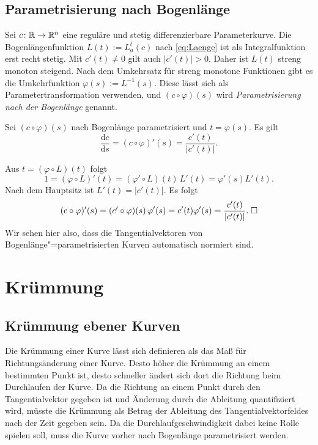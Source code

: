 \subsection{Parametrisierung nach Bogenlänge}

Sei $c\colon\mathbb R\to\mathbb R^n$ eine reguläre und stetig differenzierbare
Parameterkurve. Die Bogenlängenfunktion $L(t):=L_a^t(c)$ nach
\eqref{eq:Laenge} ist als Integralfunktion erst recht stetig.
Mit $c'(t)\ne 0$ gilt auch $|c'(t)|>0$. Daher ist $L(t)$ streng monoton
steigend. Nach dem Umkehrsatz für streng monotone Funktionen gibt es
die Umkehrfunktion $\varphi(s):=L^{-1}(s)$. Diese lässt sich als
Parametertransformation verwenden, und $(c\circ\varphi)(s)$ wird
\emph{Parametrisierung nach der Bogenlänge} genannt.

\begin{corollary}
Sei $(c\circ\varphi)(s)$ nach Bogenlänge parametrisiert
und $t=\varphi(s)$. Es gilt
\begin{equation}
\frac{\mathrm dc}{\mathrm ds} =
(c\circ\varphi)'(s) = \frac{c'(t)}{|c'(t)|}.
\end{equation}
\end{corollary}
\noindent{}
Aus $t=(\varphi\circ L)(t)$ folgt
\begin{equation}
1 = (\varphi\circ L)'(t) = (\varphi'\circ L)(t)\,L'(t) = \varphi'(s)L'(t).
\end{equation}
Nach dem Hauptsitz ist $L'(t)=|c'(t)|$. Es folgt
\begin{equation}
(c\circ\varphi)'(s) = (c'\circ\varphi)(s)\,\varphi'(s) = c'(t)\varphi'(s)
= \frac{c'(t)}{|c'(t)|}.\;\Box
\end{equation}
Wir sehen hier also, dass die Tangentialvektoren von
Bogenlänge"=parametrisierten Kurven automatisch normiert sind.

\section{Krümmung}
\subsection{Krümmung ebener Kurven}

Die Krümmung einer Kurve lässt sich definieren als das Maß für
Richtungsänderung einer Kurve. Desto höher die Krümmung an einem
bestimmten Punkt ist, desto schneller ändert sich dort die
Richtung beim Durchlaufen der Kurve. Da die Richtung an einem
Punkt durch den Tangentialvektor gegeben ist und Änderung
durch die Ableitung quantifiziert wird, müsste die Krümmung
als Betrag der Ableitung des Tangentialvektorfeldes nach der Zeit
gegeben sein. Da die Durchlaufgeschwindigkeit dabei keine Rolle spielen
soll, muss die Kurve vorher nach Bogenlänge parametrisiert werden.

